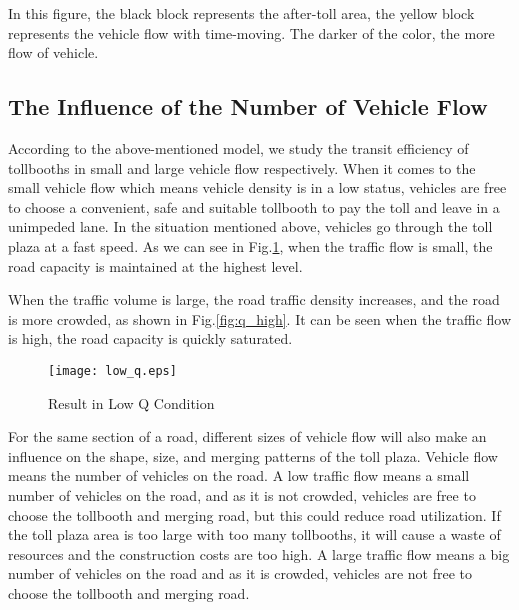 \documentclass{mcmthesis}
\begin{document}
In this figure, the black block represents the after-toll area, the yellow block represents the vehicle flow with time-moving. The darker of the color, the more flow of vehicle.
\subsection{The Influence of the Number of Vehicle Flow}
According to the above-mentioned model, we study the transit efficiency of tollbooths in small and large vehicle flow respectively. When it comes to the small vehicle flow which means vehicle density is in a low status, vehicles are free to choose a convenient, safe and suitable tollbooth to pay the toll and leave in a unimpeded lane. In the situation mentioned above, vehicles go through the toll plaza at a fast speed. As we can see in  Fig.\ref{fig:q_low}, when the traffic flow is small, the road capacity is maintained at the highest level.

When the traffic volume is large, the road traffic density increases, and the road is more crowded, as shown in Fig.\ref{fig:q_high}. It can be seen when the traffic flow is high, the road capacity is quickly saturated.
\begin{figure}[!htbp]
	\small
	\centering
	\texttt{[image: low\_q.eps]}
	\caption{\label{fig:q_low}Result in Low Q Condition} 
\end{figure}

For the same section of a road, different sizes of vehicle flow will also make an influence on the shape, size, and merging patterns of the toll plaza. Vehicle flow means the number of vehicles on the road. A low traffic flow means a small number of vehicles on the road, and as it is not crowded, vehicles are free to choose the tollbooth and merging road, but this could reduce road utilization. If the toll plaza area is too large with too many tollbooths, it will cause a waste of resources and the construction costs are too high. A large traffic flow means a big number of vehicles on the road and as it is crowded, vehicles are not free to choose the tollbooth and merging road.
\end{document}
